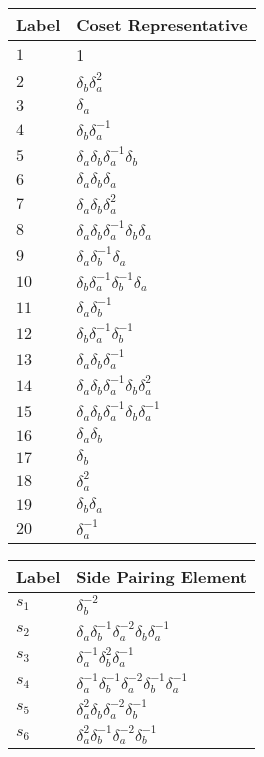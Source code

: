 \documentclass{article}
\begin{document}
\begin{center}
\begin{tabular}{ll}
\toprule
Label & Coset Representative\\
\midrule
$1$ & 1 \\
$2$ & $\delta_b^{}\delta_a^{2}$ \\
$3$ & $\delta_a^{}$ \\
$4$ & $\delta_b^{}\delta_a^{-1}$ \\
$5$ & $\delta_a^{}\delta_b^{}\delta_a^{-1}\delta_b^{}$ \\
$6$ & $\delta_a^{}\delta_b^{}\delta_a^{}$ \\
$7$ & $\delta_a^{}\delta_b^{}\delta_a^{2}$ \\
$8$ & $\delta_a^{}\delta_b^{}\delta_a^{-1}\delta_b^{}\delta_a^{}$ \\
$9$ & $\delta_a^{}\delta_b^{-1}\delta_a^{}$ \\
$10$ & $\delta_b^{}\delta_a^{-1}\delta_b^{-1}\delta_a^{}$ \\
$11$ & $\delta_a^{}\delta_b^{-1}$ \\
$12$ & $\delta_b^{}\delta_a^{-1}\delta_b^{-1}$ \\
$13$ & $\delta_a^{}\delta_b^{}\delta_a^{-1}$ \\
$14$ & $\delta_a^{}\delta_b^{}\delta_a^{-1}\delta_b^{}\delta_a^{2}$ \\
$15$ & $\delta_a^{}\delta_b^{}\delta_a^{-1}\delta_b^{}\delta_a^{-1}$ \\
$16$ & $\delta_a^{}\delta_b^{}$ \\
$17$ & $\delta_b^{}$ \\
$18$ & $\delta_a^{2}$ \\
$19$ & $\delta_b^{}\delta_a^{}$ \\
$20$ & $\delta_a^{-1}$ \\
\bottomrule
\end{tabular}
\hfill
\begin{tabular}{ll}
\toprule
Label & Side Pairing Element\\
\midrule
$s_{1}$ & $\delta_b^{-2}$ \\
$s_{2}$ & $\delta_a^{}\delta_b^{-1}\delta_a^{-2}\delta_b^{}\delta_a^{-1}$ \\
$s_{3}$ & $\delta_a^{-1}\delta_b^{2}\delta_a^{-1}$ \\
$s_{4}$ & $\delta_a^{-1}\delta_b^{-1}\delta_a^{-2}\delta_b^{-1}\delta_a^{-1}$ \\
$s_{5}$ & $\delta_a^{2}\delta_b^{}\delta_a^{-2}\delta_b^{-1}$ \\
$s_{6}$ & $\delta_a^{2}\delta_b^{-1}\delta_a^{-2}\delta_b^{-1}$ \\

\end{tabular}
\end{center}
\end{document}
